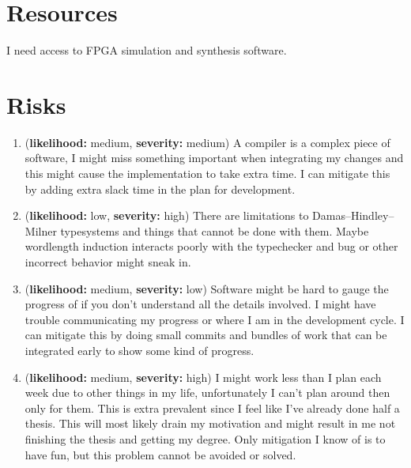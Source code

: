 \documentclass[msc,lith,english]{liuthesis}
\begin{document}

\section{Resources}
I need access to FPGA simulation and synthesis software.

\section{Risks}

\newcommand{\riskHeader}[2]{(\textbf{likelihood:} #1, \textbf{severity:} #2)}
\begin{enumerate}
  \item \riskHeader{medium}{medium} A compiler is a complex piece of software, I might miss something important when integrating my changes and this might cause the implementation to take extra time. I can mitigate this by adding extra slack time in the plan for development.

  \item \riskHeader{low}{high} There are limitations to Damas–Hindley–Milner typesystems and things that cannot be done with them. Maybe wordlength induction interacts poorly with the typechecker and bug or other incorrect behavior might sneak in.

  \item \riskHeader{medium}{low} Software might be hard to gauge the progress of if you don't understand all the details involved. I might have trouble communicating my progress or where I am in the development cycle. I can mitigate this by doing small commits and bundles of work that can be integrated early to show some kind of progress.

  \item \riskHeader{medium}{high} I might work less than I plan each week due to other things in my life, unfortunately I can't plan around then only for them. This is extra prevalent since I feel like I've already done half a thesis. This will most likely drain my motivation and might result in me not finishing the thesis and getting my degree. Only mitigation I know of is to have fun, but this problem cannot be avoided or solved.

\end{enumerate}

\printbibliography

\todos
\end{document}

